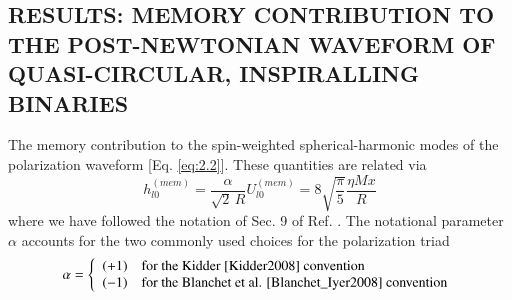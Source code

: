 \documentclass[prd,preprintnumbers,twocolumn,eqsecnum,floatfix,letter]{revtex4}
\begin{document}
\begin{widetext}
\subsection{RESULTS: MEMORY CONTRIBUTION TO THE POST-NEWTONIAN WAVEFORM OF QUASI-CIRCULAR, INSPIRALLING BINARIES}
The memory contribution to the spin-weighted spherical-harmonic modes of the polarization waveform [Eq. \ref{eq:2.2}]. These quantities are related via 
\begin{equation}
	h_{l0}^{(mem)} = \frac{\alpha}{\sqrt{2} \, R} U_{l0}^{(mem)} = 8 \sqrt{\frac{\pi}{5}}\frac{\eta M x}{R} 
\end{equation}
where we have followed the notation of Sec. 9 of Ref. \cite{Blanchet_Iyer2008}. The notational parameter $\alpha$ accounts for the two commonly used choices for the polarization triad 
\begin{equation}
\alpha = \left\{
\begin{array}{ll}
(+1) & \text{for the Kidder  \cite{Kidder2008} convention} \\
(-1) & \text{for the Blanchet et al. \cite{Blanchet_Iyer2008}   convention}\\
\end{array} 
\right.
\end{equation}


\end{widetext}
\end{document}
